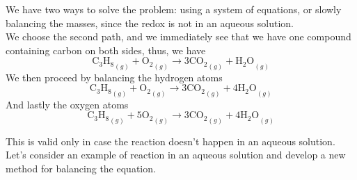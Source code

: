 \documentclass[../qm.tex]{subfiles}
\begin{document}
\begin{sol}
	We have two ways to solve the problem: using a system of equations, or slowly balancing the masses, since the redox is not in an aqueous solution.\\
	We choose the second path, and we immediately see that we have one compound containing carbon on both sides, thus, we have
	\begin{equation*}
		\mathrm{C_3H_8}_{(g)}+\mathrm{O_2}_{(g)}\to3\mathrm{CO_2}_{(g)}+\mathrm{H_2O}_{(g)}
	\end{equation*}
	We then proceed by balancing the hydrogen atoms
	\begin{equation*}
		\mathrm{C_3H_8}_{(g)}+\mathrm{O_2}_{(g)}\to3\mathrm{CO_2}_{(g)}+4\mathrm{H_2O}_{(g)}
	\end{equation*}
	And lastly the oxygen atoms
	\begin{equation}
		\mathrm{C_3H_8}_{(g)}+5\mathrm{O_2}_{(g)}\to3\mathrm{CO_2}_{(g)}+4\mathrm{H_2O}_{(g)}
	\end{equation}
\end{sol}
This is valid only in case the reaction doesn't happen in an aqueous solution. Let's consider an example of reaction in an aqueous solution and develop a new method for balancing the equation.
\end{document}
